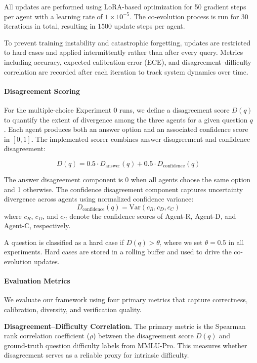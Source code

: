 \documentclass{article}
\begin{document}
All updates are performed using LoRA-based optimization for 50 gradient steps per agent with a learning rate of $1 \times 10^{-5}$. The co-evolution process is run for 30 iterations in total, resulting in 1500 update steps per agent.

To prevent training instability and catastrophic forgetting, updates are restricted to hard cases and applied intermittently rather than after every query. Metrics including accuracy, expected calibration error (ECE), and disagreement–difficulty correlation are recorded after each iteration to track system dynamics over time.
\paragraph{Disagreement Scoring}
For the multiple-choice Experiment 0 runs, we define a disagreement score $D(q)$ to quantify the extent of divergence among the three agents for a given question $q$. Each agent produces both an answer option and an associated confidence score in $[0,1]$. The implemented scorer combines answer disagreement and confidence disagreement:

\begin{equation}
D(q) = 0.5 \cdot D_{\text{answer}}(q) + 0.5 \cdot D_{\text{confidence}}(q)
\end{equation}

The answer disagreement component is 0 when all agents choose the same option
and 1 otherwise. The confidence disagreement component captures uncertainty
divergence across agents using normalized confidence variance:
\begin{equation}
D_{\text{confidence}}(q) = \mathrm{Var}(c_R, c_D, c_C)
\end{equation}
where $c_R$, $c_D$, and $c_C$ denote the confidence scores of Agent-R, Agent-D, and Agent-C, respectively.

A question is classified as a hard case if $D(q) > \theta$, where we set $\theta = 0.5$ in all experiments. Hard cases are stored in a rolling buffer and used to drive the co-evolution updates.
\paragraph{Evaluation Metrics}
We evaluate our framework using four primary metrics that capture correctness, calibration, diversity, and verification quality.

\textbf{Disagreement–Difficulty Correlation.} The primary metric is the Spearman rank correlation coefficient ($\rho$) between the disagreement score $D(q)$ and ground-truth question difficulty labels from MMLU-Pro. This measures whether disagreement serves as a reliable proxy for intrinsic difficulty.
\end{document}
